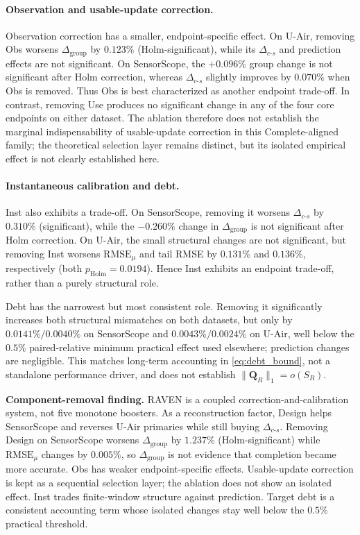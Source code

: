 \documentclass[letterpaper,journal]{IEEEtran}
\begin{document}
\paragraph{Observation and usable-update correction.}
Observation correction has a smaller, endpoint-specific effect.  On U-Air,
removing Obs worsens $\Delta_{\mathrm{group}}$ by $0.123\%$
(Holm-significant), while its $\Delta_{c\text{-}s}$ and prediction effects are
not significant.  On SensorScope, the $+0.096\%$ group change is not
significant after Holm correction, whereas
$\Delta_{c\text{-}s}$ slightly improves by $0.070\%$ when Obs is removed.
Thus Obs is best characterized as another endpoint trade-off.  In contrast,
removing Use produces no significant change in any of the four core endpoints
on either dataset.  The ablation therefore does not establish the marginal
indispensability of usable-update correction in this Complete-aligned family;
the theoretical selection layer remains distinct, but its isolated empirical
effect is not clearly established here.

\paragraph{Instantaneous calibration and debt.}
Inst also exhibits a trade-off.  On SensorScope, removing it worsens
$\Delta_{c\text{-}s}$ by $0.310\%$ (significant), while the
$-0.260\%$ change in $\Delta_{\mathrm{group}}$ is not significant after Holm
correction.  On U-Air, the small structural
changes are not significant, but removing Inst worsens
$\mathrm{RMSE}_{\mu}$ and tail RMSE by $0.131\%$ and $0.136\%$,
respectively (both $p_{\mathrm{Holm}}=0.0194$).  Hence Inst exhibits an
endpoint trade-off, rather than a purely structural role.

Debt has the narrowest but most consistent role.  Removing it significantly
increases both structural mismatches on both datasets, but only by
$0.0141\%/0.0040\%$ on SensorScope and
$0.0043\%/0.0024\%$ on U-Air, well below the $0.5\%$ paired-relative
minimum practical effect used elsewhere; prediction changes are negligible.
This matches long-term accounting in \eqref{eq:debt_bound}, not a
standalone performance driver, and does not establish
$\|\mathbf Q_R\|_1=o(S_R)$.

\noindent\textbf{Component-removal finding.}
RAVEN is a coupled correction-and-calibration system, not five monotone
boosters.  As a reconstruction factor, Design helps SensorScope and
reverses U-Air primaries while still buying $\Delta_{c\text{-}s}$.
Removing Design on SensorScope worsens $\Delta_{\mathrm{group}}$ by
$1.237\%$ (Holm-significant) while $\mathrm{RMSE}_{\mu}$ changes by
$0.005\%$, so $\Delta_{\mathrm{group}}$ is not evidence that completion
became more accurate.
Obs has weaker endpoint-specific effects.  Usable-update correction is
kept as a sequential selection layer; the ablation does not show an isolated
effect.  Inst trades finite-window structure against prediction.
Target debt is a consistent accounting term whose isolated changes stay
well below the $0.5\%$ practical threshold.
\end{document}
